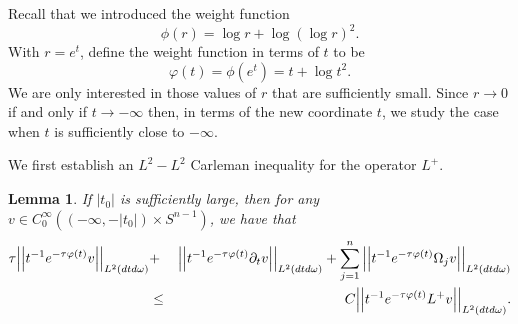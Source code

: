 \documentclass[11pt]{amsart}
\theoremstyle{plain}
\newtheorem{lemma}{Lemma}
\numberwithin{equation}{section}
\begin{document}
Recall that we introduced the weight function
$$\phi(r)=\log r+\log(\log r)^2.$$
With $r=e^t$, define the weight function in terms of $t$ to be
$$\varphi(t)=\phi(e^t)=t+\log t^2.$$
We are only interested in those values of $r$ that are sufficiently small.
Since $r\to 0$ if and only if $t\to-\infty$ then, in terms of the new coordinate $t$, we study the case when $t$ is sufficiently close to $-\infty$.

We first establish an $L^2- L^2$ Carleman inequality for the operator $L^+$.

\begin{lemma}
If ${\left\vert{t_0}\right\vert}$ is sufficiently large, then for any $v \in C^{\infty}_0{\left( {{\left( {-{\infty}, -{\left\vert{t_0}\right\vert}} \right) } \times S^{n-1}} \right) }$, we have that
\begin{eqnarray}
\tau {\left\vert\left\vert {t^{-1} e^{-\tau \varphi(t)}v}\right\vert\right\vert}_{L^2(dtd\omega )}
&+&{\left\vert\left\vert {t^{-1}e^{-\tau \varphi(t)} \partial_t v}\right\vert\right\vert}_{L^2(dtd\omega )}
+\sum_{j=1}^n {\left\vert\left\vert {t^{-1}e^{-\tau \varphi(t)} \Omega_j v }\right\vert\right\vert}_{L^2(dtd\omega )}   \nonumber \medskip\\
&\leq& C{\left\vert\left\vert {t^{-1} e^{-\tau \varphi(t)} L^+v}\right\vert\right\vert}_{L^2(dtd\omega )}.
\label{cond}
 \end{eqnarray}
\label{Car22}
\end{lemma}
\end{document}
